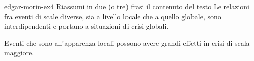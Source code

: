 \documentclass[preview]{standalone}
\begin{document}
\begin{snippetexercise}{edgar-morin-ex4}
{Riassumi in due (o tre) frasi il contenuto del testo}
    Le relazioni fra eventi di scale diverse, sia a livello locale che a quello globale, 
    sono interdipendenti e portano a situazioni di crisi globali.

    Eventi che sono all'apparenza locali possono avere grandi effetti in crisi di scala maggiore.
\end{snippetexercise}
\end{document}
